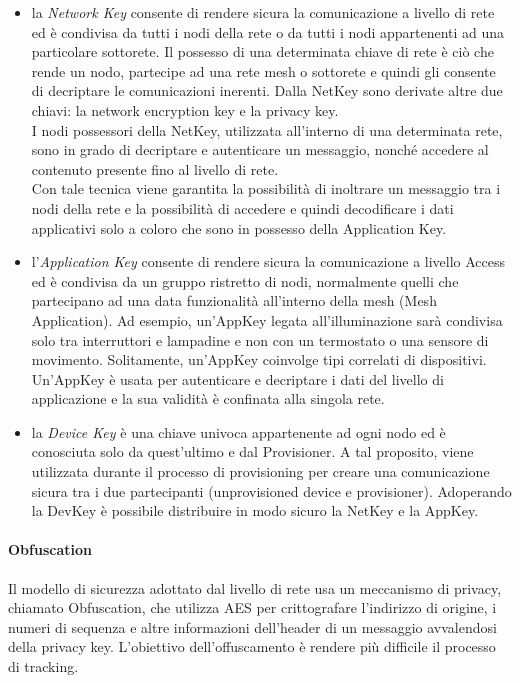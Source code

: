 \begin{itemize}
    \item la \textit{Network Key} consente di rendere sicura la comunicazione a livello di rete ed è condivisa da tutti i nodi della rete o da tutti i nodi appartenenti ad una particolare sottorete. Il possesso di una determinata chiave di rete è ciò che rende un nodo, partecipe ad una rete mesh o sottorete e quindi gli consente di decriptare le comunicazioni inerenti. Dalla NetKey sono derivate altre due chiavi: la network encryption key e la privacy key. \\
    I nodi possessori della NetKey, utilizzata all'interno di una determinata rete, sono in grado di decriptare e autenticare un messaggio, nonché accedere al contenuto presente fino al livello di rete.\\
    Con tale tecnica viene garantita la possibilità di inoltrare un messaggio tra i nodi della rete e la possibilità di accedere e quindi decodificare i dati applicativi solo a coloro che sono in possesso della Application Key.

    \item l'\textit{Application Key} consente di rendere sicura la comunicazione a livello Access ed è condivisa da un gruppo ristretto di nodi, normalmente quelli che partecipano ad una data funzionalità all'interno della mesh (Mesh Application). Ad esempio, un'AppKey legata all'illuminazione sarà condivisa solo tra interruttori e lampadine e non con un termostato o una sensore di movimento. Solitamente, un'AppKey coinvolge tipi correlati di dispositivi. \\ 
    Un'AppKey è usata per autenticare e decriptare i dati del livello di applicazione e la sua validità è confinata alla singola rete.
    
    \item la \textit{Device Key} è una chiave univoca appartenente ad ogni nodo ed è conosciuta solo da quest'ultimo e dal Provisioner. A tal proposito, viene utilizzata durante il processo di provisioning per creare una comunicazione sicura tra i due partecipanti (unprovisioned device e provisioner). Adoperando la DevKey è possibile distribuire in modo sicuro la NetKey e la AppKey.

\end{itemize}

\paragraph{Obfuscation}
Il modello di sicurezza adottato dal livello di rete usa un meccanismo di privacy, chiamato Obfuscation, che utilizza AES per crittografare l'indirizzo di origine, i numeri di sequenza e altre informazioni dell'header di un messaggio avvalendosi della privacy key. L'obiettivo dell'offuscamento è rendere più difficile il processo di tracking.

